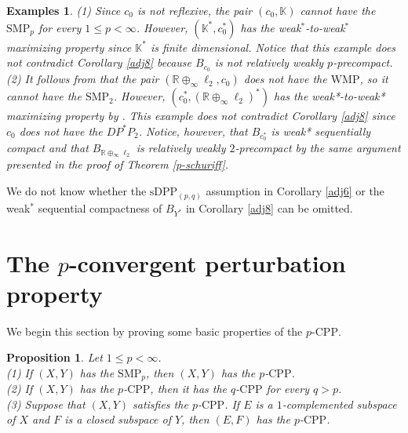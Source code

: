 \documentclass[12 pt]{article}%
\newtheorem{proposition}[theorem]{Proposition}
\newtheorem{examples}[theorem]{Examples}
\newtheorem{final remark}[theorem]{Final Remark}
\newcommand {\R}{\mathbb{R}}
\newcommand {\K} {\mathbb{K}}
\begin{document}
\begin{examples} \label{adj9}
    \rm (1) Since $c_0$ is not reflexive, the pair $(c_0, \K)$ cannot have the $\mathrm{SMP}_p$ for every $1 \leq p < \infty$. However, $(\K^*, c_0^*)$ has the weak$^*$-to-weak$^*$ maximizing property since $\K^*$ is finite dimensional. Notice that this example does not contradict Corollary \ref{adj8} because $B_{c_0}$ is not relatively weakly $p$-precompact. \\
    (2) It follows from \cite[Remark 3.2]{garcia-lirola} that the pair $(\R \oplus_\infty \ell_2, c_0)$ does not have the $\mathrm{WMP}$, so it cannot have the $\mathrm{SMP}_2$. However, $(c_0^*, (\R \oplus_\infty \ell_2)^*)$ has the weak*-to-weak* maximizing property by \cite[Corollary 5.3]{garcia-lirola}. This example does not contradict Corollary \ref{adj8} since $c_0$ does not have the $DP^*P_2$. Notice, however, that $B_{c_0^*}$ is weak* sequentially compact and that $B_{\R \oplus_\infty \ell_2}$ is relatively weakly $2$-precompact by the same argument presented in the proof of Theorem \ref{p-schuriff}.
\end{examples}



We do not know whether the $\mathrm{sDPP}_{(p,q)}$ assumption in Corollary \ref{adj6} or the weak$^*$ sequential compactness of $B_{Y^*}$ in Corollary \ref{adj8} can be omitted. %

\section{The $p$-convergent perturbation property}

We begin this section by proving some basic properties of the $p$-$\mathrm{CPP}$. 


\begin{proposition}\label{pcpp1}
Let $1\leq p<\infty$. \\
{\rm (1)} If $(X,Y)$ has the $\mathrm{SMP}_p$, then $(X,Y)$ has the $p$-$\mathrm{CPP}$.\\
{\rm (2)} If $(X, Y)$ has the $p$-$\mathrm{CPP}$, then it has the $q$-$\mathrm{CPP}$ for every $q > p$. \\
{\rm (3)} Suppose that $(X, Y)$ satisfies the $p$-$\mathrm{CPP}$. If $E$ is a $1$-complemented subspace of $X$ and $F$ is a closed subspace of $Y$, then $(E,F)$ has the $p$-$\mathrm{CPP}$. 
\end{proposition}
\end{document}
